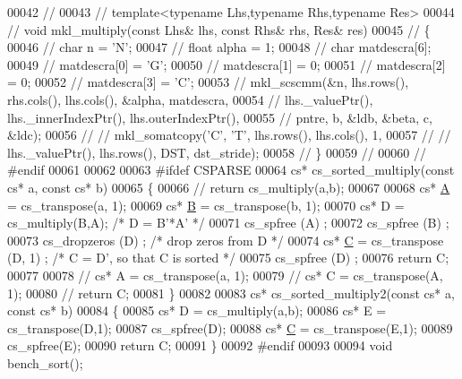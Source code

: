 \begin{DoxyCode}
00042 \textcolor{comment}{//}
00043 \textcolor{comment}{// template<typename Lhs,typename Rhs,typename Res>}
00044 \textcolor{comment}{// void mkl\_multiply(const Lhs& lhs, const Rhs& rhs, Res& res)}
00045 \textcolor{comment}{// \{}
00046 \textcolor{comment}{//   char n = 'N';}
00047 \textcolor{comment}{//   float alpha = 1;}
00048 \textcolor{comment}{//   char matdescra[6];}
00049 \textcolor{comment}{//   matdescra[0] = 'G';}
00050 \textcolor{comment}{//   matdescra[1] = 0;}
00051 \textcolor{comment}{//   matdescra[2] = 0;}
00052 \textcolor{comment}{//   matdescra[3] = 'C';}
00053 \textcolor{comment}{//   mkl\_scscmm(&n, lhs.rows(), rhs.cols(), lhs.cols(), &alpha, matdescra,}
00054 \textcolor{comment}{//              lhs.\_valuePtr(), lhs.\_innerIndexPtr(), lhs.outerIndexPtr(),}
00055 \textcolor{comment}{//              pntre, b, &ldb, &beta, c, &ldc);}
00056 \textcolor{comment}{// //   mkl\_somatcopy('C', 'T', lhs.rows(), lhs.cols(), 1,}
00057 \textcolor{comment}{// //                 lhs.\_valuePtr(), lhs.rows(), DST, dst\_stride);}
00058 \textcolor{comment}{// \}}
00059 \textcolor{comment}{//}
00060 \textcolor{comment}{// #endif}
00061 
00062 
00063 \textcolor{preprocessor}{#ifdef CSPARSE}
00064 cs* cs\_sorted\_multiply(\textcolor{keyword}{const} cs* a, \textcolor{keyword}{const} cs* b)
00065 \{
00066 \textcolor{comment}{//   return cs\_multiply(a,b);}
00067 
00068   cs* \hyperlink{group___core___module_class_eigen_1_1_matrix}{A} = cs\_transpose(a, 1);
00069   cs* \hyperlink{group___core___module_class_eigen_1_1_matrix}{B} = cs\_transpose(b, 1);
00070   cs* D = cs\_multiply(B,A);   \textcolor{comment}{/* D = B'*A' */}
00071   cs\_spfree (A) ;
00072   cs\_spfree (B) ;
00073   cs\_dropzeros (D) ;      \textcolor{comment}{/* drop zeros from D */}
00074   cs* \hyperlink{group___core___module}{C} = cs\_transpose (D, 1) ;   \textcolor{comment}{/* C = D', so that C is sorted */}
00075   cs\_spfree (D) ;
00076   \textcolor{keywordflow}{return} C;
00077 
00078 \textcolor{comment}{//   cs* A = cs\_transpose(a, 1);}
00079 \textcolor{comment}{//   cs* C = cs\_transpose(A, 1);}
00080 \textcolor{comment}{//   return C;}
00081 \}
00082 
00083 cs* cs\_sorted\_multiply2(\textcolor{keyword}{const} cs* a, \textcolor{keyword}{const} cs* b)
00084 \{
00085   cs* D = cs\_multiply(a,b);
00086   cs* E = cs\_transpose(D,1);
00087   cs\_spfree(D);
00088   cs* \hyperlink{group___core___module}{C} = cs\_transpose(E,1);
00089   cs\_spfree(E);
00090   \textcolor{keywordflow}{return} C;
00091 \}
00092 \textcolor{preprocessor}{#endif}
00093 
00094 \textcolor{keywordtype}{void} bench\_sort();

\end{DoxyCode}
